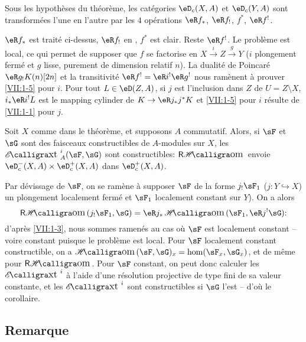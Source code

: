 \begin{corollary_}\label{VII:1-5}
Sous les hypoth\`eses du th\'eor\`eme, les cat\'egories $\eD_c(X,A)$ et 
$\eD_c(Y,A)$ sont transform\'ees l'une en l'autre par les $4$ op\'erations 
$\eR f_\ast$, $\eR f_!$, $f^\ast$, $\eR f^!$. 
\end{corollary_}

$\eR f_\ast$ est trait\'e ci-dessus, $\eR f_!$ en \cite[XVII 5.3]{sga4}, 
$f^\ast$ est clair. Reste $\eR f^!$. Le probl\`eme est local, ce qui permet de 
supposer que $f$ se factorise en $X\xrightarrow i Z \xrightarrow g Y$ ($i$ 
plongement ferm\'e et $g$ lisse, purement de dimension relatif $n$). La 
dualit\'e de Poincar\'e $\eR g_! K(n)[2 n]$ et la transitivit\'e 
$\eR f^! = \eR i^! \eR g^!$ nous ram\`enent \`a prouver \ref{VII:1-5} pour $i$. 
Pour tout $L\in \eD(Z,A)$, si $j$ est l'inclusion dans $Z$ de $U=Z\setminus X$, 
$i_\ast \eR i^! L$ est le mapping cylinder de $K\to \eR j_\ast j^\ast K$ et 
\ref{VII:1-5} pour $i$ r\'esulte de \ref{VII:1-1} pour $j$. 





\begin{corollary_}\label{VII:1-6}
Soit $X$ comme dans le th\'eor\`eme, et supposons $A$ commutatif. Alors, si 
$\sF$ et $\sG$ sont des faisceaux constructibles de $A$-modules sur $X$, les 
$\Ext_A^i(\sF,\sG)$ sont constructibles: $\rHom$ envoie 
$\eD_c^-(X,A)\times \eD_c^+(X,A)$ dans $\eD_c^+(X,A)$. 
\end{corollary_}

Par d\'evissage de $\sF$, on se ram\`ene \`a supposer $\sF$ de la forme 
$j_!\sF_1$ ($j:Y\hookrightarrow X$) un plongement localement ferm\'e et $\sF_1$ 
localement constant sur $Y$). On a alors 
\[
  \rHom(j_! \sF_1,\sG) = \eR j_\ast \Hom(\sF_1,\eR j^! \sG) \text{:} 
\]
d'apr\`es \ref{VII:1-3}, nous sommes ramen\'es au cas o\`u $\sF$ est localement 
constant -- voire constant puisque le probl\`eme est local. Pour $\sF$ 
localement constant constructible, on a $\Hom(\sF,\sG)_x=\hom(\sF_x,\sG_x)$, 
et de m\^eme pour $\rHom$. Pour $\sF$ constant, on peut donc calculer les 
$\Ext^i$ \`a l'aide d'une r\'esolution projective de type fini de sa valeur 
constante, et les $\Ext^i$ sont constructibles si $\sG$ l'est -- d'o\`u le 
corollaire. 





\subsection{Remarque}\label{VII:1-7}

